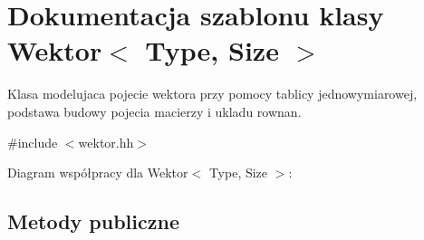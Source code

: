 \hypertarget{class_wektor}{}\section{Dokumentacja szablonu klasy Wektor$<$ Type, Size $>$}
\label{class_wektor}


Klasa modelujaca pojecie wektora przy pomocy tablicy jednowymiarowej, podstawa budowy pojecia macierzy i ukladu rownan.  




{\ttfamily \#include $<$wektor.\+hh$>$}



Diagram współpracy dla Wektor$<$ Type, Size $>$\+:
\subsection*{Metody publiczne}
